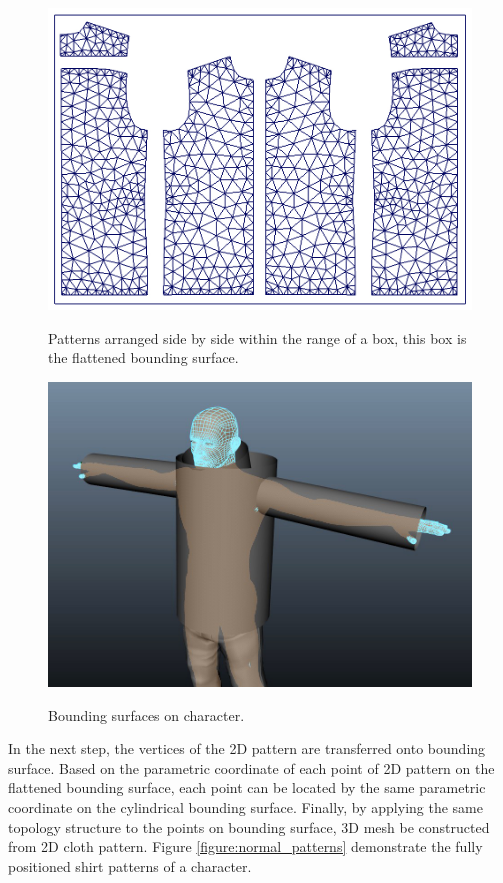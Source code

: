 \begin{figure}[H]
	\centering
	\includegraphics[width=0.95\columnwidth]{../images/pattern_and_boundingBox}\\[0.1cm]
    \caption[Patterns in a box]{Patterns arranged side by side within the range of a box, this box is the flattened bounding surface.}
    \label{figure:pattern_and_boundingBox}
\end{figure}

\begin{figure}[H]
	\centering
	\includegraphics[width=0.9\columnwidth]{../images/bounding_surface}\\[0.1cm]
    \caption{ Bounding surfaces on character.}
    \label{figure:sewing_bounding_surface}
\end{figure}

In the next step, the vertices of the 2D pattern are transferred onto bounding surface. Based on the parametric coordinate of each point of 2D pattern on the flattened bounding surface, each point can be located by the same parametric coordinate on the cylindrical bounding surface. Finally, by applying the same topology structure to the points on bounding surface, 3D mesh be constructed from 2D cloth pattern. Figure \ref{figure:normal_patterns} demonstrate the fully positioned shirt patterns of a character.  

